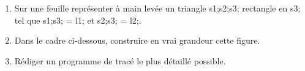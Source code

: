 \documentclass[exercice]{thedocument}%
\begin{document}
%
\begin{enumerate}
    \item Sur une feuille représenter à main levée un triangle
    \<s1;\<s2;\<s3; rectangle en {\<s3;} tel que \<s1;\<s3; = \<l1;
    et \<s2;\<s3; = \<l2;.
    \item Dans le cadre ci-dessous, construire en vrai grandeur cette figure.
    \item Rédiger un programme de tracé le plus détaillé possible.
\end{enumerate}
\begin{mdframed}
    \vspace{8cm}
\end{mdframed}
\end{document}
